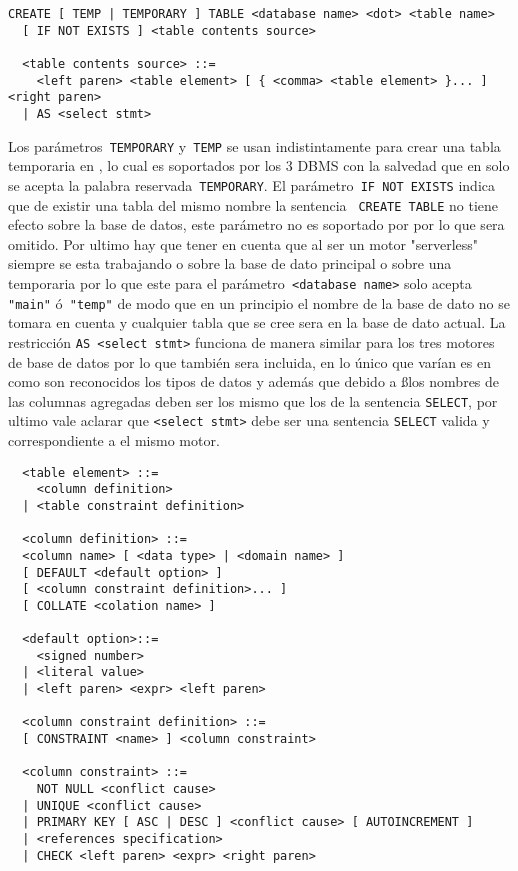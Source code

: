 \begin{Verbatim}[frame=leftline, framesep=3mm]
  CREATE [ TEMP | TEMPORARY ] TABLE <database name> <dot> <table name> 
  [ IF NOT EXISTS ] <table contents source>

  <table contents source> ::=
    <left paren> <table element> [ { <comma> <table element> }... ] <right paren>
  | AS <select stmt>
\end{Verbatim}

Los parámetros\verb= TEMPORARY= y\verb= TEMP= se usan indistintamente para crear una tabla temporaria en \s, lo cual es soportados por los 3 DBMS con la salvedad que en \m solo se acepta la palabra reservada\verb= TEMPORARY=. El parámetro\verb= IF NOT EXISTS= indica que de existir una tabla del mismo nombre la sentencia \verb= CREATE TABLE= no tiene efecto sobre la base de datos, este parámetro no es soportado por \p por lo que sera omitido. Por ultimo hay que tener en cuenta que al ser \s un motor "serverless" siempre se esta trabajando o sobre la base de dato principal o sobre una temporaria por lo que este para el parámetro\verb= <database name>= solo acepta\verb= "main"= ó\verb= "temp"= de modo que en un principio el nombre de la base de dato no se tomara en cuenta y cualquier tabla que se cree sera en la base de dato actual.  La restricción \verb=AS <select stmt>= funciona de manera similar para los tres motores de base de datos por lo que también sera incluida, en lo único que varían es en como son reconocidos los tipos de datos y además que debido a \ss los nombres de las columnas agregadas deben ser los mismo que los de la sentencia \verb=SELECT=, por ultimo vale aclarar que \verb=<select stmt>= debe ser una sentencia \verb=SELECT= valida y correspondiente a el mismo motor.

\begin{Verbatim}
  <table element> ::=
    <column definition>
  | <table constraint definition>

  <column definition> ::=
  <column name> [ <data type> | <domain name> ]
  [ DEFAULT <default option> ]
  [ <column constraint definition>... ]
  [ COLLATE <colation name> ]

  <default option>::=
    <signed number>
  | <literal value>
  | <left paren> <expr> <left paren>
  
  <column constraint definition> ::=
  [ CONSTRAINT <name> ] <column constraint>

  <column constraint> ::=
    NOT NULL <conflict cause>
  | UNIQUE <conflict cause>
  | PRIMARY KEY [ ASC | DESC ] <conflict cause> [ AUTOINCREMENT ]
  | <references specification>
  | CHECK <left paren> <expr> <right paren>
\end{Verbatim}

